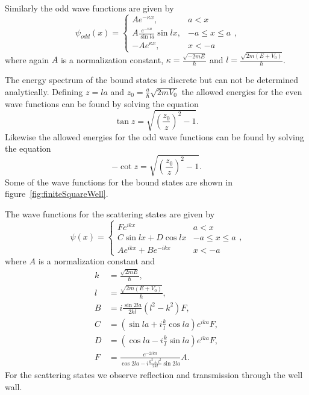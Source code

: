 \documentclass[12pt,a4paper]{article}
\begin{document}
Similarly the odd wave functions are given by
\begin{equation}
\psi_{odd} (x) = \begin{cases} A e^{- \kappa x}, & a < x \\
                                A \frac{e^{- \kappa a}}{\sin la} \sin l x, & -a \leq x \leq a \\
                                - A e^{\kappa x}, & x < -a \end{cases},
\end{equation}
where again $A$ is a normalization constant, $\kappa = \frac{\sqrt{-2 m E}}{\hbar}$ and $l = \frac{\sqrt{2 m (E + V_0)}}{\hbar}$.

The energy spectrum of the bound states is discrete but can not be determined analytically. Defining $z = l a$ and $z_0 = \frac{a}{\hbar} \sqrt{2 m V_0}$ the allowed energies for the even wave functions can be found by solving the equation
\begin{equation}
\tan z = \sqrt{\left(\frac{z_0}{z} \right)^2 - 1}. \label{eq:evenEnergy}
\end{equation}
Likewise the allowed energies for the odd wave functions can be found by solving the equation
\begin{equation}
- \cot z = \sqrt{\left(\frac{z_0}{z} \right)^2 - 1}. \label{eq:oddEnergy}
\end{equation}
Some of the wave functions for the bound states are shown in figure~\ref{fig:finiteSquareWell}.

The wave functions for the scattering states are given by
\begin{equation}
\psi(x) = \begin{cases} F e^{ikx} & a < x \\
                        C \sin lx + D \cos lx & -a \leq x \leq a \\
                        A e^{ikx} + B e^{-ikx} & x < -a \end{cases},
\end{equation}
where $A$ is a normalization constant and
\begin{align*}
k &= \frac{\sqrt{2 m E}}{\hbar}, \\
l &= \frac{\sqrt{2 m (E + V_0)}}{\hbar}, \\
B &= i \frac{\sin 2 la}{2 kl} \left( l^2 - k^2 \right) F, \\
C &= \left( \sin la + i \frac{k}{l} \cos la \right) e^{ika} F, \\
D &= \left( \cos la - i \frac{k}{l} \sin la \right) e^{ika} F, \\
F &= \frac{e^{-2ika}}{\cos 2la - i \frac{k^2 + l^2}{2kl} \sin 2la} A.
\end{align*}
For the scattering states we observe reflection and transmission through the well wall.
\end{document}
